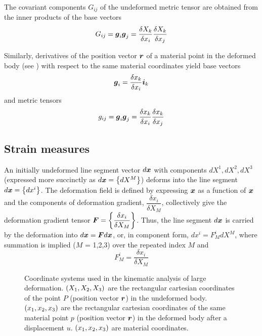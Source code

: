 The covariant components $G_{ij}$ of the undeformed metric tensor
are obtained from the inner products of the base vectors
\begin{equation}
  G_{ij}= \vect{G}_{i}\vect{G}_{j}=\dfrac{\delta X_{k}}{\delta x_{i}}
  \dfrac{\delta X_{k}}{\delta x_{j}}
  \label{eq:bv}
\end{equation}
 
Similarly, derivatives of the position vector $\vect{r}$ of a material
point in the deformed body (see ) with respect to the
same material coordinates yield base vectors
\begin{equation}
 \vect{g}_{i} = \dfrac{\delta x_{k}}{\delta x_{i}} \vect{i}_{k}
 \label{eq:bv2}
\end{equation}
and metric tensors
\begin{equation}
 g_{ij}= \vect{g}_{i} \vect{g}_{j} = \dfrac{\delta x_{k}}{\delta x_{i}}
 \dfrac{\delta x_{k}}{\delta x_{j}}
 \label{eq:mt}
\end{equation}

\subsection{Strain measures}
An initially undeformed line segment vector $d\vect{X}$
with components $dX^{1}, dX^{2}, dX^{3}$ (expressed more succinctly as
$d\vect{X} =\bbrac{dX^{M}}$) deforms into the line segment $d\vect{x}=
\bbrac{dx^{i}}$.  The deformation field is defined by expressing $\vect{x}$ as
a function of $\vect{X}$ and the components of deformation gradient,
$\dfrac{\delta x_{i}}{\delta X_{M}}$, collectively give the deformation
gradient tensor $\matr{F} = \bbrac{\dfrac{\delta x_{i}}{\delta X_{M}}}$.
Thus, the line segment $d\vect{X}$ is carried by the deformation into
$d\vect{x} = \matr{F}d\vect{X}$, or, in component form, $dx^{i} =
F^{i}_{M}dX^{M}$, where summation is implied ($M$ = 1,2,3) over the repeated
index $M$ and
\begin{equation}
  F^{i}_{M} = \dfrac{\delta x_{i}}{\delta X_{M}}
  \label{eq:ri}
\end{equation}
 
\begin{figure}\centering
  \caption{Coordinate systems used in the kinematic
    analysis of large deformation. $\left( X_{1},X_{2},X_{3} \right)$ are the
    rectangular cartesian coordinates of the point $P$
    (position vector $\vect{R}$) in the undeformed body. $\left( x_{1},x_{2},x_{3} \right)$
    are the rectangular cartesian coordinates of the same
    material point $p$ (position vector $\vect{r}$) in the deformed
    body after a displacement $u$. $\left( x_{1},x_{2},x_{3} \right)$ are material
    coordinates.}
  \label{fig:cs}
\end{figure} 

